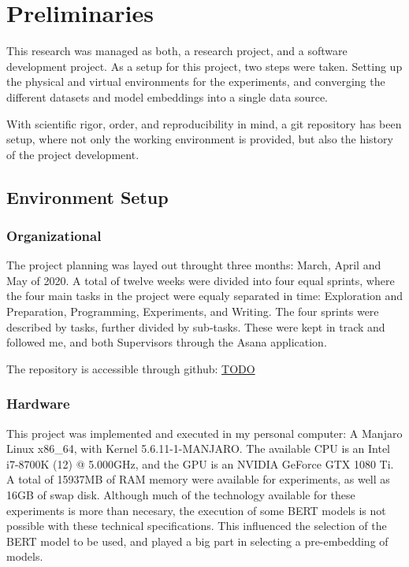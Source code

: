 \section{Preliminaries}\label{sec:Preliminaries}
This research was managed as both, a research project, and a software development project.
As a setup for this project, two steps were taken. Setting up the physical and virtual environments for the experiments, and converging the different datasets and model embeddings into a single data source.

With scientific rigor, order, and reproducibility in mind, a git repository has been setup, where not only the working environment is provided, but also the history of the project  development.


\subsection{Environment Setup}\label{sub:Environment Setup}
\subsubsection{Organizational}\label{subs:Organizational}
The project planning was layed out throught three months: March, April and May of 2020. A total of twelve weeks were divided into four equal sprints, where the four main tasks in the project were equaly separated in time: Exploration and Preparation, Programming, Experiments, and Writing. The four sprints were described by tasks, further divided by sub-tasks. These were kept in track and followed me, and both Supervisors through the Asana application\cite{TODO}.

The repository is accessible through github: \url{TODO}

\subsubsection{Hardware}\label{subs:Hardware}
This project was implemented and executed in my personal computer: A Manjaro Linux x86_64, with Kernel 5.6.11-1-MANJARO. The available CPU is an Intel i7-8700K (12) @ 5.000GHz, and the GPU is an NVIDIA GeForce GTX 1080 Ti. A total of 15937MB of RAM memory were available for experiments, as well as 16GB of swap disk. Although much of the technology available for these experiments is more than necesary, the execution of some BERT models is not possible with these technical specifications. This influenced the selection of the BERT model to be used, and played a big part in selecting a pre-embedding of models.

